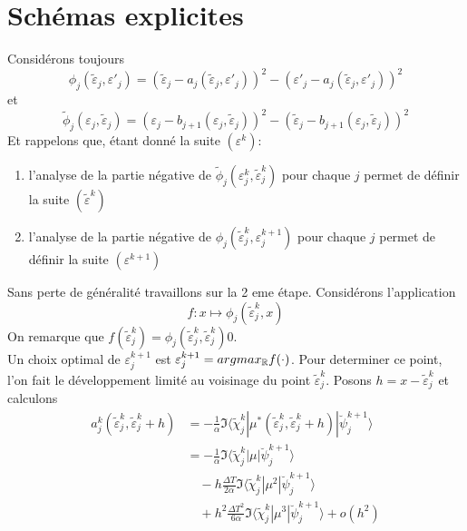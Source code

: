 \section{Schémas explicites}
Considérons toujours
\begin{equation}
\phi_j(\tilde{\varepsilon}_j,\varepsilon'_j) = (\tilde{\varepsilon}_j-a_j(\tilde{\varepsilon}_j,\varepsilon'_j))^2 - (\varepsilon'_j-a_j(\tilde{\varepsilon}_j,\varepsilon'_j))^2
\end{equation}
et
\begin{equation}
\tilde{\phi}_j(\varepsilon_j,\tilde{\varepsilon}_j) = (\varepsilon_j-b_{j+1}(\varepsilon_j,\tilde{\varepsilon}_j))^2 - (\tilde{\varepsilon}_j-b_{j+1}(\varepsilon_j,\tilde{\varepsilon}_j))^2
\end{equation}
Et rappelons que, étant donné la suite $(\varepsilon^{k})$:
\begin{enumerate}
	\item l'analyse de la partie négative de $\tilde{\phi}_j(\varepsilon_j^k,\tilde{\varepsilon}_j^k)$ pour chaque $j$ permet de définir la suite $(\tilde{\varepsilon}^k)$
	\item l'analyse de la partie négative de $\phi_j(\tilde{\varepsilon}_j^k,\varepsilon_j^{k+1})$ pour chaque $j$ permet de définir la suite $(\varepsilon^{k+1})$
\end{enumerate}
Sans perte de généralité travaillons sur la 2 eme étape. Considérons l'application 
$$f : x \mapsto \phi_j(\tilde{\varepsilon}_j^k,x)$$
On remarque que $f(\tilde{\varepsilon}_j^k)=\phi_j(\tilde{\varepsilon}_j^k,\tilde{\varepsilon}_j^k)0$.\\ Un choix optimal de $\varepsilon_j^{k+1}$ est $\varepsilon_j^{k+1} = argmax_{\mathbb R} f(\cdot)$. Pour determiner ce point, l'on fait le développement limité au voisinage du point $\tilde{\varepsilon}_j^k$. Posons $h=x-\tilde{\varepsilon}_j^k$ et calculons
\begin{align*}
a_j^k(\tilde{\varepsilon}_j^k,\tilde{\varepsilon}_j^k+h)
&=-\frac{1}{\alpha} \Im \langle \tilde{\chi}_j^k |\mu^{*}(\tilde{\varepsilon}_j^k,\tilde{\varepsilon}_j^k+h)| \breve{\psi}_j^{k+1} \rangle\\
&=-\frac{1}{\alpha} \Im \langle \tilde{\chi}_j^k |\mu| \breve{\psi}_j^{k+1} \rangle\\
&\quad -h\frac{\Delta T}{2\alpha} \Im \langle \tilde{\chi}_j^k |\mu^2| \breve{\psi}_j^{k+1} \rangle\\
&\quad +h^2\frac{\Delta T^2}{6\alpha} \Im \langle \tilde{\chi}_j^k |\mu^3| \breve{\psi}_j^{k+1} \rangle + o(h^2)\\
\end{align*}
